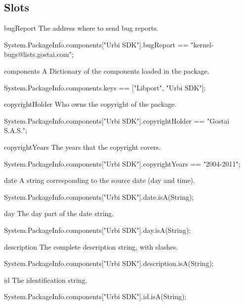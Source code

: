 \subsection{Slots}
\begin{urbiscriptapi}
\item[bugReport] The address where to send bug reports.
\begin{urbiassert}
System.PackageInfo.components["Urbi SDK"].bugReport
  == "kernel-bugs@lists.gostai.com";
\end{urbiassert}


\item[components] A Dictionary of the components loaded in the package.
\begin{urbiassert}
System.PackageInfo.components.keys == ["Libport", "Urbi SDK"];
\end{urbiassert}


\item[copyrightHolder] Who owns the copyright of the package.
\begin{urbiassert}
System.PackageInfo.components["Urbi SDK"].copyrightHolder
  == "Gostai S.A.S.";
\end{urbiassert}


\item[copyrightYears] The years that the copyright covers.
\begin{urbiassert}
System.PackageInfo.components["Urbi SDK"].copyrightYears
  == "2004-2011";
\end{urbiassert}


\item[date] A string corresponding to the source date (day and time).
\begin{urbiassert}
System.PackageInfo.components["Urbi SDK"].date.isA(String);
\end{urbiassert}


\item[day] The day part of the date string.
\begin{urbiassert}
System.PackageInfo.components["Urbi SDK"].day.isA(String);
\end{urbiassert}


\item[description] The complete description string, with slashes.
\begin{urbiassert}
System.PackageInfo.components["Urbi SDK"].description.isA(String);
\end{urbiassert}


\item[id] The identification string.
\begin{urbiassert}
System.PackageInfo.components["Urbi SDK"].id.isA(String);
\end{urbiassert}



\end{urbiscriptapi}
